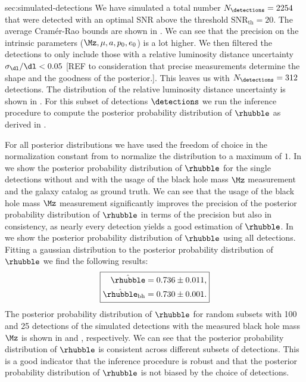 {sec:simulated-detections}
We have simulated a total number $N_{\detections} = 2254$ that were detected with an optimal SNR above the threshold $\text{SNR}_{\text{th}} = 20$. The average Cramér-Rao bounds are shown in . We can see that the precision on the intrinsic parameters ($\Mz, \mu, a, p_0, e_0$) is a lot higher. We then filtered the detections to only include those with a relative luminosity distance uncertainty $\sigma_{\dl} / \dl < 0.05$ [REF to consideration that precise measurements determine the shape and the goodness of the posterior.]. This leaves us with $N_{\detections} = 312$ detections. The distribution of the relative luminosity distance uncertainty is shown in . For this subset of detections $\detections$ we run the inference procedure to compute the posterior probability distribution of $\rhubble$ as derived in .

For all posterior distributions we have used the freedom of choice in the normalization constant from  to normalize the distribution to a maximum of $1$.
In  we show the posterior probability distribution of $\rhubble$ for the single detections without and with the usage of the black hole mass $\Mz$ measurement and the galaxy catalog as ground truth. We can see that the usage of the black hole mass $\Mz$ measurement significantly improves the precision of the posterior probability distribution of $\rhubble$ in terms of the precision but also in consistency, as nearly every detection yields a good estimation of $\rhubble$. In  we show the posterior probability distribution of $\rhubble$ using all detections. Fitting a gaussian distribution to the posterior probability distribution of $\rhubble$ we find the following results:
\begin{equation}
    \label{eq:galaxy-catalog-only-results}
    \boxed{
        \begin{aligned}
            \hat{\rhubble}           & = 0.736 \pm 0.011, \\
            \hat{\rhubble}_\text{bh} & = 0.730 \pm 0.001.
        \end{aligned}
    }
\end{equation}
The posterior probability distribution of $\rhubble$ for random subsets with 100 and 25 detections of the simulated detections with the measured black hole mass $\Mz$ is shown in  and , respectively. We can see that the posterior probability distribution of $\rhubble$ is consistent across different subsets of detections. This is a good indicator that the inference procedure is robust and that the posterior probability distribution of $\rhubble$ is not biased by the choice of detections.
